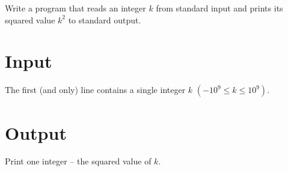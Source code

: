 \documentclass[en]{spiral}
\begin{document}
  \makeheader

  \noindent
  Write a program that reads an integer $k$ from standard input and prints its squared
  value $k^2$ to standard output.

  \section{Input}

    The first (and only) line contains a single integer $k$ $(-10^9 \leq k \leq 10^9)$.

  \section{Output}

    Print one integer – the squared value of $k$.
\end{document}
